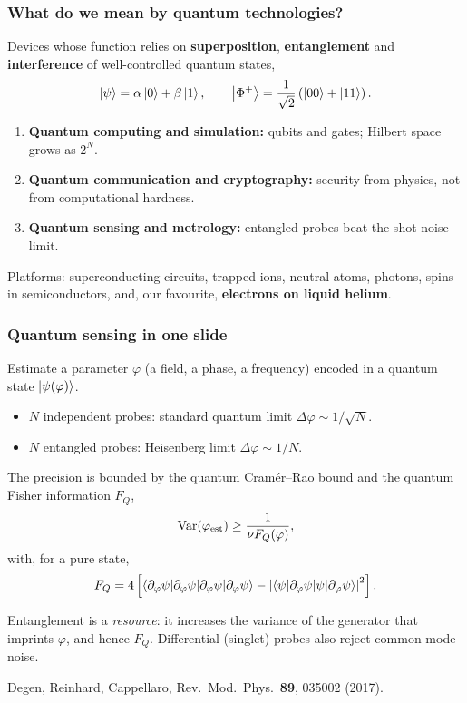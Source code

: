 \documentclass{beamer}
\begin{document}
\begin{frame}
\frametitle{What do we mean by quantum technologies?}
Devices whose function relies on \textbf{superposition}, \textbf{entanglement} and \textbf{interference} of well-controlled quantum states,
\[
\ket{\psi}=\alpha\ket{0}+\beta\ket{1},\qquad
\ket{\Phi^+}=\frac{1}{\sqrt{2}}\left(\ket{00}+\ket{11}\right).
\]
\begin{enumerate}
\item \textbf{Quantum computing and simulation:} qubits and gates; Hilbert space grows as $2^N$.
\item \textbf{Quantum communication and cryptography:} security from physics, not from computational hardness.
\item \textbf{Quantum sensing and metrology:} entangled probes beat the shot-noise limit.
\end{enumerate}
\begin{block}{}
Platforms: superconducting circuits, trapped ions, neutral atoms, photons, spins in semiconductors, and, our favourite, \textbf{electrons on liquid helium}.
\end{block}
\end{frame}

\begin{frame}
\frametitle{Quantum sensing in one slide}
Estimate a parameter $\varphi$ (a field, a phase, a frequency) encoded in a quantum state $\ket{\psi(\varphi)}$.
\begin{itemize}
\item $N$ independent probes: standard quantum limit $\Delta\varphi \sim 1/\sqrt{N}$.
\item $N$ entangled probes: Heisenberg limit $\Delta\varphi \sim 1/N$.
\end{itemize}
The precision is bounded by the quantum Cram\'er--Rao bound and the quantum Fisher information $F_Q$,
\[
\mathrm{Var}(\varphi_{\rm est}) \ge \frac{1}{\nu F_Q(\varphi)},
\]
with, for a pure state,
\[
F_Q = 4\left[\braket{\partial_\varphi\psi|\partial_\varphi\psi}-\left|\braket{\psi|\partial_\varphi\psi}\right|^2\right].
\]
\begin{block}{}
Entanglement is a \emph{resource}: it increases the variance of the generator that imprints $\varphi$, and hence $F_Q$. Differential (singlet) probes also reject common-mode noise.
\end{block}
{\footnotesize Degen, Reinhard, Cappellaro, Rev.\ Mod.\ Phys.\ \textbf{89}, 035002 (2017).}
\end{frame}
\end{document}
